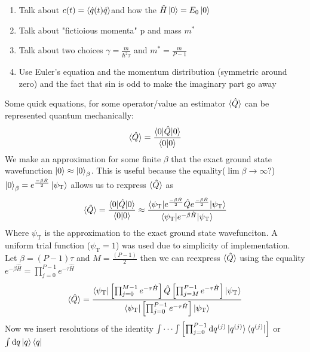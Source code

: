 \documentclass[12pt,letterpaper,oneside,final,titlepage]{article}               %
\numberwithin{equation}{section} %
\newcommand{\psiT}{\psi_{\textrm{T}}}
\newcommand{\eBHf}{e^{\frac{-\beta\hat{H}}{2}}}
\newcommand{\eBH}{e^{-\beta\hat{H}}}
\newcommand{\eTH}{e^{-\tau\hat{H}}}
\begin{document}
\begin{enumerate}
    \item Talk about $c(t) = \braket{\hat{q}(t)\hat{q}} $and how the $\hat{H}\ket{0} = E_{0}\ket{0}$
    \item Talk about "fictioious momenta" p and mass $m^{*}$
    \item Talk about two choices $\gamma = \frac{m}{\hbar^{2}\tau}$ and $m^{*} = \frac{m}{P-1}$
    \item Use Euler's equation and the momentum distribution (symmetric around zero) and the fact that sin is odd to make the imaginary part go away
\end{enumerate}




Some quick equations, for some operator/value an estimator $\braket{\hat{Q}}$ can be represented quantum mechanically:
\begin{equation}
    \braket{\hat{Q}} = \frac{\braket{0|\hat{Q}|0}}{\braket{0|0}}
\end{equation}
We make an approximation for some finite $\beta$ that the exact ground state wavefunction $\ket{0} \approx \ket{0}_{\beta}$.
This is useful because the equality($\lim{\beta \to \infty}$?) $\ket{0}_{\beta} = \eBHf\ket{\psiT}$ allows us to rexpress $\braket{\hat{Q}}$ as
\begin{equation}
	\braket{\hat{Q}} = \frac{\braket{0|\hat{Q}|0}}{\braket{0|0}} \approx \frac{\braket{\psiT|\eBHf\hat{Q}\eBHf|\psiT}} {\braket{\psiT|\eBH|\psiT}} 
\end{equation}
Where $\psiT$ is the approximation to the exact ground state wavefunciton. 
A uniform trial function ($\psiT = 1$) was used due to simplicity of implementation. \\
Let $\beta = (P-1)\tau$ and $M = \frac{(P-1)}{2}$ then we can reexpress $\braket{\hat{Q}}$ using the equality $\eBH = \prod_{j=0}^{P-1} \eTH$
\begin{align}
    \braket{\hat{Q}} = \frac{\braket{\psiT|
                            \left[\prod_{j=0}^{M-1} \eTH\right]
                            \hat{Q}
                            \left[\prod_{j=M}^{P-1} \eTH\right]
                            |\psiT}}
                            {\braket{\psiT|\left[\prod_{j=0}^{P-1} \eTH\right]|\psiT}} 
\end{align}
Now we insert resolutions of the identity
$\int\cdots\int\left[\prod_{j=0}^{P-1}\dif q^{(j)}\ket{q^{(j)}}\bra{q^{(j)}}\right]$ or
$\int \dif q\ket{q}\bra{q}$
\end{document}
